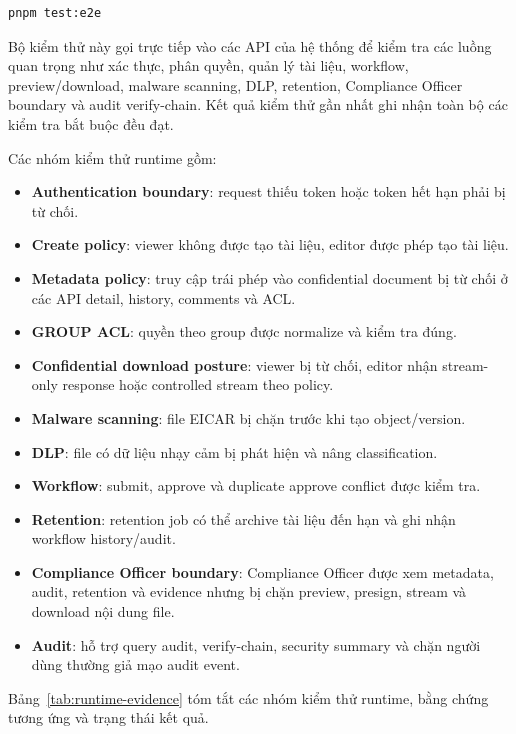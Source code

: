 \begin{lstlisting}[language=bash,caption={Lệnh kiểm thử E2E runtime}]
pnpm test:e2e
\end{lstlisting}

Bộ kiểm thử này gọi trực tiếp vào các API của hệ thống để kiểm tra các luồng quan trọng như xác thực, phân quyền, quản lý tài liệu, workflow, preview/download, malware scanning, DLP, retention, Compliance Officer boundary và audit verify-chain. Kết quả kiểm thử gần nhất ghi nhận toàn bộ các kiểm tra bắt buộc đều đạt.

Các nhóm kiểm thử runtime gồm:

\begin{itemize}
  \item \textbf{Authentication boundary}: request thiếu token hoặc token hết hạn phải bị từ chối.
  \item \textbf{Create policy}: viewer không được tạo tài liệu, editor được phép tạo tài liệu.
  \item \textbf{Metadata policy}: truy cập trái phép vào confidential document bị từ chối ở các API detail, history, comments và ACL.
  \item \textbf{GROUP ACL}: quyền  theo group được normalize và kiểm tra đúng.
  \item \textbf{Confidential download posture}: viewer bị từ chối, editor nhận stream-only response hoặc controlled stream theo policy.
  \item \textbf{Malware scanning}: file EICAR bị chặn trước khi tạo object/version.
  \item \textbf{DLP}: file có dữ liệu nhạy cảm bị phát hiện và nâng classification.
  \item \textbf{Workflow}: submit, approve và duplicate approve conflict được kiểm tra.
  \item \textbf{Retention}: retention job có thể archive tài liệu đến hạn và ghi nhận workflow history/audit.
  \item \textbf{Compliance Officer boundary}: Compliance Officer được xem metadata, audit, retention và evidence nhưng bị chặn preview, presign, stream và download nội dung file.
  \item \textbf{Audit}: hỗ trợ query audit, verify-chain, security summary và chặn người dùng thường giả mạo audit event.
\end{itemize}

Bảng~\ref{tab:runtime-evidence} tóm tắt các nhóm kiểm thử runtime, bằng chứng tương ứng và trạng thái kết quả.

